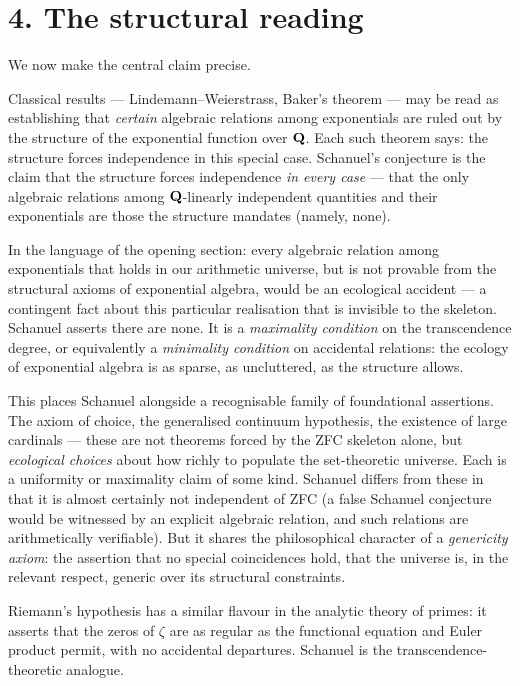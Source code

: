 \section{4. The structural reading}

We now make the central claim precise.

Classical results --- Lindemann--Weierstrass, Baker's theorem --- may be read
as establishing that {\it certain} algebraic relations among exponentials are
ruled out by the structure of the exponential function over ${\bf Q}$. Each such
theorem says: the structure forces independence in this special case. Schanuel's
conjecture is the claim that the structure forces independence {\it in every
case} --- that the only algebraic relations among ${\bf Q}$-linearly independent
quantities and their exponentials are those the structure mandates (namely,
none).

In the language of the opening section: every algebraic relation among
exponentials that holds in our arithmetic universe, but is not provable from
the structural axioms of exponential algebra, would be an ecological accident
--- a contingent fact about this particular realisation that is invisible to the
skeleton. Schanuel asserts there are none. It is a {\it maximality condition}
on the transcendence degree, or equivalently a {\it minimality condition} on
accidental relations: the ecology of exponential algebra is as sparse, as
uncluttered, as the structure allows.


This places Schanuel alongside a recognisable family of foundational assertions.
The axiom of choice, the generalised continuum hypothesis, the existence of
large cardinals --- these are not theorems forced by the ZFC skeleton alone, but
{\it ecological choices} about how richly to populate the set-theoretic
universe. Each is a uniformity or maximality claim of some kind. Schanuel
differs from these in that it is almost certainly not independent of ZFC (a
false Schanuel conjecture would be witnessed by an explicit algebraic relation,
and such relations are arithmetically verifiable). But it shares the
philosophical character of a {\it genericity axiom}: the assertion that no
special coincidences hold, that the universe is, in the relevant respect,
generic over its structural constraints.

Riemann's hypothesis has a similar flavour in the analytic theory of primes:
it asserts that the zeros of $\zeta$ are as regular as the functional equation
and Euler product permit, with no accidental departures. Schanuel is the
transcendence-theoretic analogue.

